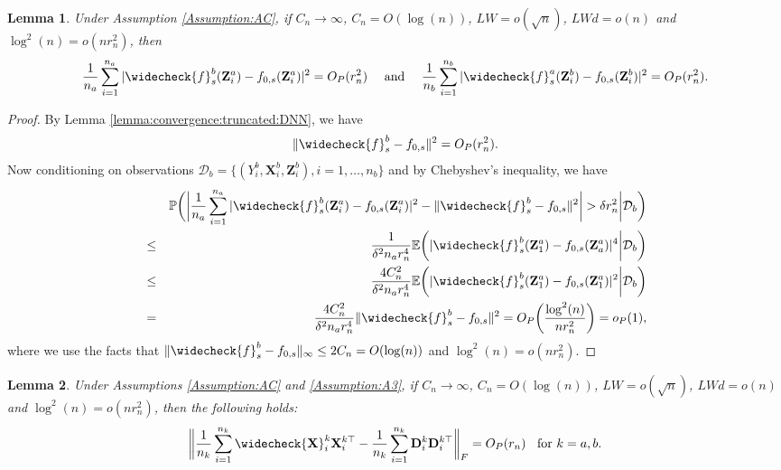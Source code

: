 \documentclass[11pt, preprint]{imsart}
\numberwithin{equation}{section}
\def \mcD{\mathcal{D}}
\def \bfD{\mathbf{D}}
\def \bfX{\mathbf{X}}
\def \bfZ{\mathbf{Z}}
\def \bfD{\mathbf{D}}
\def \ev{\mathbb{E}}
\def \pr{\mathbb{P}}
\theoremstyle{plain}
\newtheorem{lemma}{\indent Lemma}
\theoremstyle{definition}
\begin{document}
\begin{lemma}\label{lemma:split:sample:empirical:rate}
Under Assumption \ref{Assumption:AC}, if $C_n \to \infty$, $C_n=O(\log(n))$, $LW=o(\sqrt{n})$, $LWd=o(n)$ and $\log^2(n)=o(nr_n^2)$, then
\begin{eqnarray*}
	\frac{1}{n_a}\sum_{i=1}^{n_a}|\widecheck{f}_s^b(\bfZ_i^a)-f_{0,s}(\bfZ_i^a)|^2=O_P(r_n^2) \quad\textrm{  and } \quad \frac{1}{n_b}\sum_{i=1}^{n_b}|\widecheck{f}_s^a(\bfZ_i^b)-f_{0,s}(\bfZ_i^b)|^2=O_P(r_n^2).
\end{eqnarray*}
\end{lemma}
\begin{proof}
By Lemma \ref{lemma:convergence:truncated:DNN}, we have
\begin{eqnarray*}
	\|\widecheck{f}_s^b-f_{0,s}\|^2=O_P(r_n^2).
\end{eqnarray*}
Now conditioning on observations $\mcD_b=\{(Y_i^b, \bfX_i^b, \bfZ_i^b), i=1,\ldots, n_b\}$ and by Chebyshev's inequality, we have
\begin{eqnarray*}
	&&\pr\bigg(\bigg|\frac{1}{n_a}\sum_{i=1}^{n_a}|\widecheck{f}_s^b(\bfZ_i^a)-f_{0,s}(\bfZ_i^a)|^2-\|\widecheck{f}_s^b-f_{0,s}\|^2\bigg|>\delta r_n^2\bigg| \mcD_b\bigg)\nonumber\\
	&\leq& \frac{1}{\delta^2 n_ar_n^4}\ev\bigg(|\widecheck{f}_s^b(\bfZ_1^a)-f_{0,s}(\bfZ_a^a)|^4\bigg| \mcD_b\bigg)\nonumber\\
	&\leq&\frac{4C_n^2}{\delta^2n_ar_n^4}\ev\bigg(|\widecheck{f}_s^b(\bfZ_1^a)-f_{0,s}(\bfZ_1^a)|^2\bigg| \mcD_b\bigg)\nonumber\\
	&=&\frac{4C_n^2}{\delta^2n_ar_n^4}\|\widecheck{f}_s^b-f_{0,s}\|^2=O_P\bigg(\frac{\log^2(n)}{nr_n^2}\bigg)=o_P(1),
\end{eqnarray*}
where we use the facts that $\|\widecheck{f}_s^b-f_{0,s}\|_\infty\leq 2C_n=O(\log(n))$ and $\log^2(n)=o(nr_n^2)$. 
\end{proof}
\begin{lemma}\label{lemma:split:sample:difference:rate:2}
Under Assumptions \ref{Assumption:AC} and \ref{Assumption:A3}, if $C_n \to \infty$, $C_n=O(\log(n))$, $LW=o(\sqrt{n})$, $LWd=o(n)$ and $\log^2(n)=o(nr_n^2)$, then the following holds:
$$\bigg\|\frac{1}{n_k}\sum_{i=1}^{n_k}\widecheck{\bfX}_i^k{\bfX}_i^{k\top}-\frac{1}{n_k}\sum_{i=1}^{n_k}\bfD_i^k\bfD_i^{k\top}\bigg\|_F=O_P(r_n)\;\;\textrm{ for } k=a,b.$$
\end{lemma}
\end{document}
